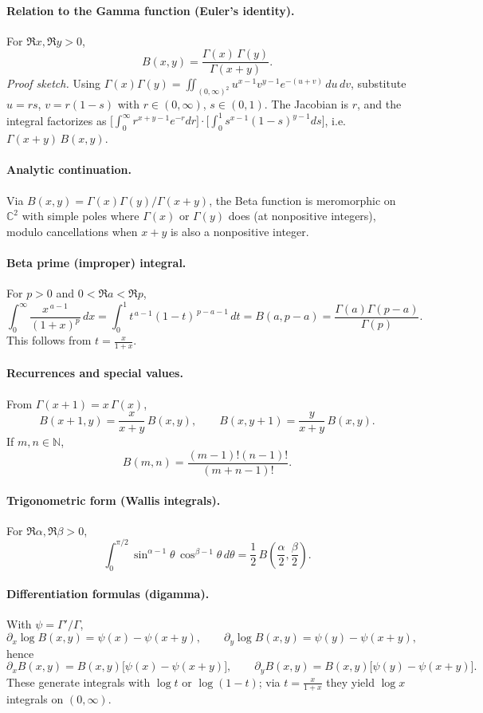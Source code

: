 \documentclass[12pt,a4paper]{article}
\newcommand{\C}{\mathbb{C}}
\begin{document}
\paragraph{Relation to the Gamma function (Euler’s identity).}
For $\Re x,\Re y>0$,
\[
B(x,y)=\frac{\Gamma(x)\,\Gamma(y)}{\Gamma(x+y)}.
\]
\emph{Proof sketch.} Using
$\Gamma(x)\Gamma(y)=\iint_{(0,\infty)^2} u^{x-1}v^{y-1}e^{-(u+v)}\,du\,dv$,
substitute $u=rs$, $v=r(1-s)$ with $r\in(0,\infty)$, $s\in(0,1)$.
The Jacobian is $r$, and the integral factorizes as
$\bigl[\int_{0}^{\infty} r^{x+y-1}e^{-r}dr\bigr]\cdot\bigl[\int_{0}^{1} s^{x-1}(1-s)^{y-1}ds\bigr]$,
i.e.\ $\Gamma(x+y)\,B(x,y)$.

\paragraph{Analytic continuation.}
Via $B(x,y)=\Gamma(x)\Gamma(y)/\Gamma(x+y)$, the Beta function is meromorphic on $\C^2$
with simple poles where $\Gamma(x)$ or $\Gamma(y)$ does (at nonpositive integers), modulo cancellations when $x+y$ is also a nonpositive integer.

\paragraph{Beta prime (improper) integral.}
For $p>0$ and $0<\Re a<\Re p$,
\[
\int_{0}^{\infty}\frac{x^{\,a-1}}{(1+x)^{p}}\,dx
=\int_{0}^{1} t^{\,a-1}(1-t)^{\,p-a-1}\,dt
=B(a,p-a)=\frac{\Gamma(a)\Gamma(p-a)}{\Gamma(p)}.
\]
This follows from $t=\frac{x}{1+x}$.

\paragraph{Recurrences and special values.}
From $\Gamma(x+1)=x\,\Gamma(x)$,
\[
B(x+1,y)=\frac{x}{x+y}\,B(x,y),\qquad
B(x,y+1)=\frac{y}{x+y}\,B(x,y).
\]
If $m,n\in\mathbb{N}$,
\[
B(m,n)=\frac{(m-1)!(n-1)!}{(m+n-1)!}.
\]

\paragraph{Trigonometric form (Wallis integrals).}
For $\Re \alpha,\Re \beta>0$,
\[
\int_{0}^{\pi/2}\sin^{\alpha-1}\theta\,\cos^{\beta-1}\theta\,d\theta
=\frac{1}{2}\,B\!\left(\frac{\alpha}{2},\frac{\beta}{2}\right).
\]

\paragraph{Differentiation formulas (digamma).}
With $\psi=\Gamma'/\Gamma$,
\[
\partial_x\log B(x,y)=\psi(x)-\psi(x+y),\qquad
\partial_y\log B(x,y)=\psi(y)-\psi(x+y),
\]
hence
\[
\partial_x B(x,y)=B(x,y)\bigl[\psi(x)-\psi(x+y)\bigr],\qquad
\partial_y B(x,y)=B(x,y)\bigl[\psi(y)-\psi(x+y)\bigr].
\]
These generate integrals with $\log t$ or $\log(1-t)$; via $t=\frac{x}{1+x}$ they yield
$\log x$ integrals on $(0,\infty)$.
\end{document}
